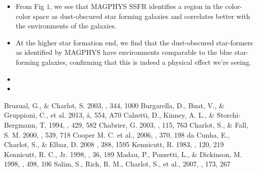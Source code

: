 \documentclass[iop]{emulateapj}
\begin{document}
\begin{itemize}
\item{From Fig $1$, we see that MAGPHYS SSFR identifies a region in the color-color space as dust-obscured star forming galaxies and correlates better with the environments of the galaxies.}
\item{At the higher star formation end, we find that the dust-obscured star-formers as identified by MAGPHYS have environments comparable to the blue star-forming galaxies, confirming that this is indeed a physical effect we're seeing.}

\item{}
\item{}
\end{itemize}

\newpage



\begin{thebibliography}{}

 Bruzual, G., \& Charlot, S. 2003, \mnras, 344, 1000
 Burgarella, D., Buat, V., \& Gruppioni, C., et al. 2013, \aa, 554, A70
Calzetti, D., Kinney, A. L., \& Storchi-Bergmann, T. 1994, \apj, 429, 582
 Chabrier, G. 2003, \pasp, 115, 763
Charlot, S., \& Fall, S. M. 2000, \apj, 539, 718
 Cooper M. C. et al., 2006, \mnras, 370, 198
 da Cunha, E., Charlot, S., \& Elbaz, D. 2008 \mnras, 388, 1595
Kennicutt, R. 1983, \textcolor{red}{\aj}, 120, 219
 Kennicutt, R. C., Jr. 1998, \araa, 36, 189
 Madau, P., Pozzetti, L., \& Dickinson, M. 1998, \apj, 498, 106
 Salim, S., Rich, R. M., Charlot, S., et al., 2007, \apjs, 173, 267
\end{thebibliography}
\end{document}
